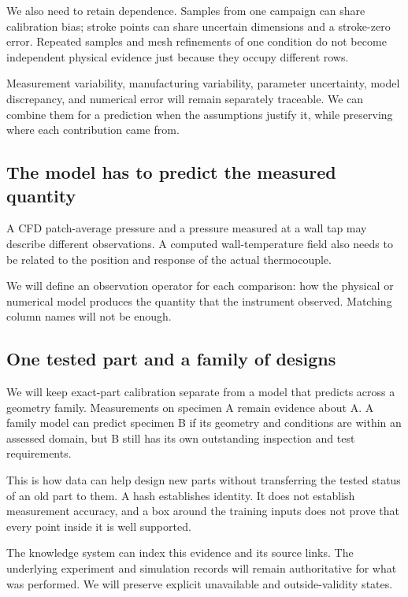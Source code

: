 We also need to retain dependence. Samples from one campaign can share calibration bias; stroke points can share uncertain dimensions and a stroke-zero error. Repeated samples and mesh refinements of one condition do not become independent physical evidence just because they occupy different rows.

Measurement variability, manufacturing variability, parameter uncertainty, model discrepancy, and numerical error will remain separately traceable. We can combine them for a prediction when the assumptions justify it, while preserving where each contribution came from.

\subsection{The model has to predict the measured quantity}

A CFD patch-average pressure and a pressure measured at a wall tap may describe different observations. A computed wall-temperature field also needs to be related to the position and response of the actual thermocouple.

We will define an observation operator for each comparison: how the physical or numerical model produces the quantity that the instrument observed. Matching column names will not be enough.

\subsection{One tested part and a family of designs}

We will keep exact-part calibration separate from a model that predicts across a geometry family. Measurements on specimen A remain evidence about A. A family model can predict specimen B if its geometry and conditions are within an assessed domain, but B still has its own outstanding inspection and test requirements.

This is how data can help design new parts without transferring the tested status of an old part to them. A hash establishes identity. It does not establish measurement accuracy, and a box around the training inputs does not prove that every point inside it is well supported.

The knowledge system can index this evidence and its source links. The underlying experiment and simulation records will remain authoritative for what was performed. We will preserve explicit unavailable and outside-validity states.

